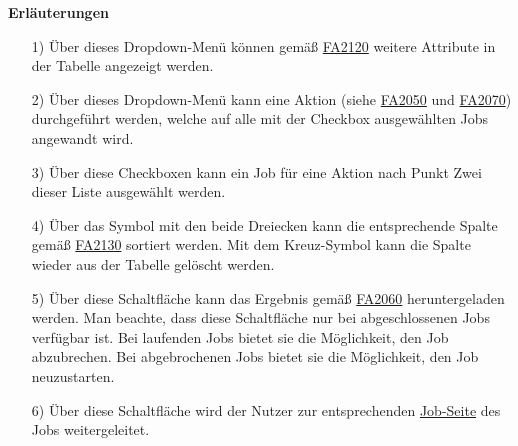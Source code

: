 \textbf{Erläuterungen}
\begin{itemize}
    \item[1)] Über dieses Dropdown-Menü können gemäß \hyperref[FA:Web-Interface:Verwalten von Spalten]{FA2120} weitere Attribute in der Tabelle angezeigt werden.
    \item[2)] Über dieses Dropdown-Menü kann eine Aktion (siehe \hyperref[FA:Web-Interface:Abbruch mehrerer Jobs auf einmal]{FA2050} und \hyperref[FA:Web-Interface:herunterladen mehrerer Ergebnisse auf einmal]{FA2070}) durchgeführt werden, welche auf alle mit der Checkbox ausgewählten Jobs angewandt wird.
    \item[3)] Über diese Checkboxen kann ein Job für eine Aktion nach Punkt Zwei dieser Liste ausgewählt werden.
    \item[4)] Über das Symbol mit den beide Dreiecken kann die entsprechende Spalte gemäß \hyperref[FA:Web-Interface:Sortieren der Tabelle]{FA2130} sortiert werden. Mit dem Kreuz-Symbol kann die Spalte wieder aus der Tabelle gelöscht werden.
    \item[5)] Über diese Schaltfläche kann das Ergebnis gemäß \hyperref[FA:Web-Interface:Herunterladen eines einzelnen Ergebnisses]{FA2060} heruntergeladen werden. Man beachte, dass diese Schaltfläche nur bei abgeschlossenen Jobs verfügbar ist. Bei laufenden Jobs bietet sie die Möglichkeit, den Job abzubrechen. Bei abgebrochenen Jobs bietet sie die Möglichkeit, den Job neuzustarten.
    \item[6)] Über diese Schaltfläche wird der Nutzer zur entsprechenden \hyperref[pages:job-page]{Job-Seite} des Jobs weitergeleitet.
\end{itemize}

\newpage
